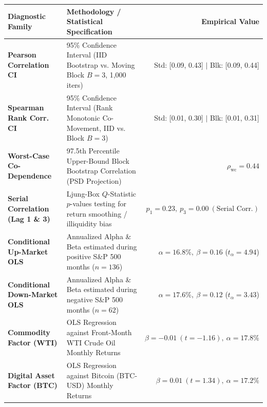 \documentclass[10pt,a4paper]{article}
\begin{document}
\begin{tcolorbox}[colback=white, colframe=primary, title=\textbf{\small\strut Appendix A: Extended Statistical, Bootstrap \& Factor Diagnostics}, fonttitle=\sffamily\bfseries\small, arc=5pt, boxrule=0.8pt, toptitle=4pt, bottomtitle=4pt, left=6pt, right=6pt, top=4pt, bottom=4pt, colbacktitle=primary]
\renewcommand{\arraystretch}{1.25}
\scriptsize
\begin{tabularx}{\textwidth}{l X r}
\toprule
\textbf{\textcolor{primary}{Diagnostic Family}} & \textbf{\textcolor{primary}{Methodology / Statistical Specification}} & \textbf{\textcolor{primary}{Empirical Value}} \\
\midrule
\textbf{Pearson Correlation CI} & 95\% Confidence Interval (IID Bootstrap vs. Moving Block $B=3$, 1,000 iters) & Std: [0.09, 0.43] $\vert$ Blk: [0.09, 0.44] \\
\rowcolor{cardbg} \textbf{Spearman Rank Corr. CI} & 95\% Confidence Interval (Rank Monotonic Co-Movement, IID vs. Block $B=3$) & Std: [0.01, 0.30] $\vert$ Blk: [0.01, 0.31] \\
\textbf{Worst-Case Co-Dependence} & 97.5th Percentile Upper-Bound Block Bootstrap Correlation (PSD Projection) & $\rho_{\text{wc}} = 0.44$ \\
\rowcolor{cardbg} \textbf{Serial Correlation (Lag 1 \& 3)} & Ljung-Box $Q$-Statistic $p$-values testing for return smoothing / illiquidity bias & $p_1=0.23,\ p_3=0.00\ (\text{Serial Corr.})$ \\
\textbf{Conditional Up-Market OLS} & Annualized Alpha \& Beta estimated during positive S\&P 500 months ($n=136$) & $\alpha=16.8\%,\ \beta=0.16$ ($t_\alpha=4.94$) \\
\rowcolor{cardbg} \textbf{Conditional Down-Market OLS} & Annualized Alpha \& Beta estimated during negative S\&P 500 months ($n=62$) & $\alpha=17.6\%,\ \beta=0.12$ ($t_\alpha=3.43$) \\
\textbf{Commodity Factor (WTI)} & OLS Regression against Front-Month WTI Crude Oil Monthly Returns & $\beta=-0.01\ (t=-1.16),\ \alpha=17.8\%$ \\
\rowcolor{cardbg} \textbf{Digital Asset Factor (BTC)} & OLS Regression against Bitcoin (BTC-USD) Monthly Returns & $\beta=0.01\ (t=1.34),\ \alpha=17.2\%$ \\
\bottomrule
\end{tabularx}
\end{tcolorbox}

\vspace{0.35em}
\end{document}
